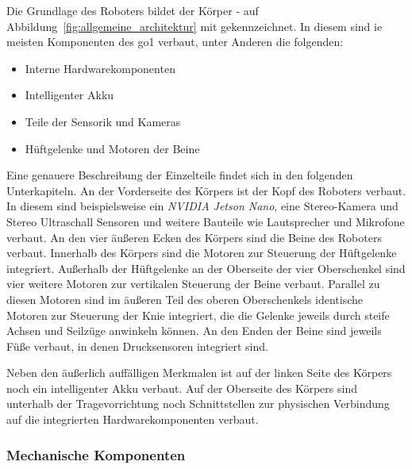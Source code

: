 Die Grundlage des Roboters bildet der Körper - auf Abbildung~\ref{fig:allgemeine_architektur} mit  gekennzeichnet.
In diesem sind ie meisten Komponenten des \gls{go1} verbaut, unter Anderen die folgenden:
\begin{itemize}
    \item Interne Hardwarekomponenten
    \item Intelligenter Akku
    \item Teile der Sensorik und Kameras
    \item Hüftgelenke und Motoren der Beine
\end{itemize}
Eine genauere Beschreibung der Einzelteile findet sich in den folgenden Unterkapiteln.
An der Vorderseite des Körpers ist der Kopf  des Roboters verbaut.
In diesem sind beispielsweise ein \emph{NVIDIA Jetson Nano}, eine Stereo-Kamera und Stereo Ultraschall Sensoren
und weitere Bauteile wie Lautsprecher und Mikrofone verbaut.
An den vier äußeren Ecken des Körpers sind die Beine des Roboters verbaut.
Innerhalb des Körpers sind die Motoren zur Steuerung der Hüftgelenke  integriert.
Außerhalb der Hüftgelenke an der Oberseite der vier Oberschenkel  sind vier weitere Motoren
zur vertikalen Steuerung der Beine verbaut.
Parallel zu diesen Motoren sind im äußeren Teil des oberen Oberschenkels identische Motoren
zur Steuerung der Knie  integriert, die die Gelenke jeweils durch steife Achsen und Seilzüge
anwinkeln können.
An den Enden der Beine sind jeweils Füße  verbaut, in denen Drucksensoren integriert sind.

Neben den äußerlich auffälligen Merkmalen ist auf der linken Seite des Körpers noch ein intelligenter Akku
 verbaut.
Auf der Oberseite des Körpers sind unterhalb der Tragevorrichtung  noch Schnittstellen  zur physischen
Verbindung auf die integrierten Hardwarekomponenten verbaut.


\subsubsection{Mechanische Komponenten}

